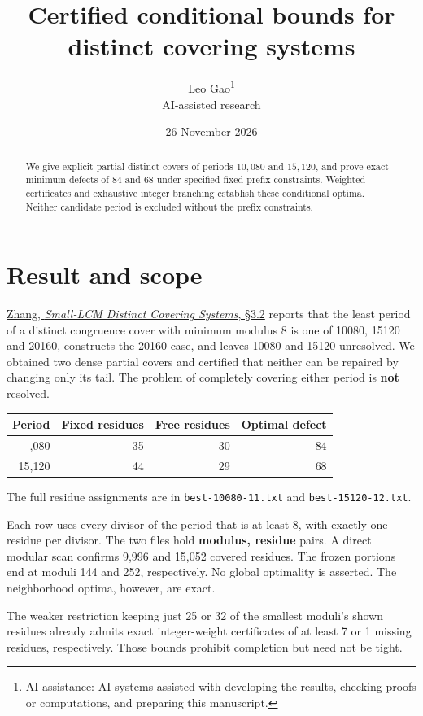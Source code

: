 \documentclass[11pt]{article}
\title{\textcolor{ink}{Certified conditional bounds for distinct covering systems}}
\author{Leo Gao\thanks{AI assistance: AI systems assisted with developing the results, checking proofs or computations, and preparing this manuscript.}\\[3pt]\small\textsf{AI-assisted research}}
\date{26 November 2026}
\begin{document}
\maketitle
\begin{abstract}
We give explicit partial distinct covers of periods \(10{,}080\) and \(15{,}120\), and prove exact minimum defects of \(84\) and \(68\) under specified fixed-prefix constraints. Weighted certificates and exhaustive integer branching establish these conditional optima. Neither candidate period is excluded without the prefix constraints.
\end{abstract}
\section{Result and scope}\label{result-and-scope}

\href{https://arxiv.org/html/2611.01282v1}{Zhang, \emph{Small-LCM Distinct Covering Systems}, §3.2} reports that the least period of a distinct congruence cover with minimum modulus 8 is one of 10080, 15120 and 20160, constructs the 20160 case, and leaves 10080 and 15120 unresolved. We obtained two dense partial covers and certified that neither can be repaired by changing only its tail. The problem of completely covering either period is \textbf{not} resolved.

\begin{longtable}[]{@{}rrrr@{}}
\toprule\noalign{}
Period & Fixed residues & Free residues & Optimal defect \\
\midrule\noalign{}
\endhead
\bottomrule\noalign{}
\endlastfoot
10,080 & 35 & 30 & 84 \\
15,120 & 44 & 29 & 68 \\
\end{longtable}

The full residue assignments are in \texttt{best-10080-11.txt} and \texttt{best-15120-12.txt}.

Each row uses every divisor of the period that is at least 8, with exactly one residue per divisor. The two files hold \textbf{modulus, residue} pairs. A direct modular scan confirms 9,996 and 15,052 covered residues. The frozen portions end at moduli 144 and 252, respectively. No global optimality is asserted. The neighborhood optima, however, are exact.

The weaker restriction keeping just 25 or 32 of the smallest moduli's shown residues already admits exact integer-weight certificates of at least 7 or 1 missing residues, respectively. Those bounds prohibit completion but need not be tight.
\end{document}
